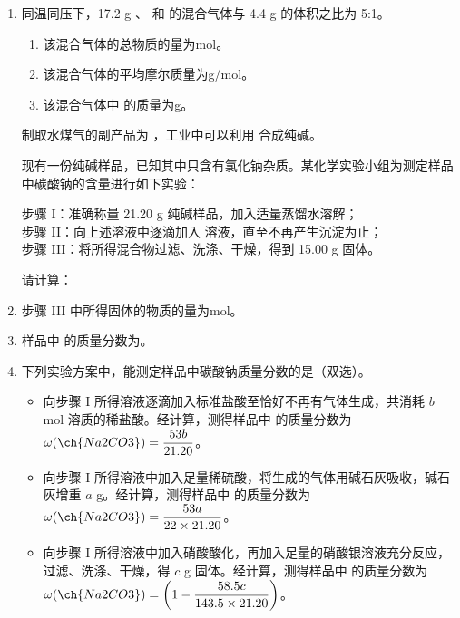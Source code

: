 \documentclass[11pt,a4paper]{article}
\begin{document}
\begin{enumerate}[label=（\arabic*）]
\item 同温同压下，17.2 g 、 和  的混合气体与 4.4 g  的体积之比为 5:1。
\begin{enumerate}[label=\textcircled{\arabic*}]
\item 该混合气体的总物质的量为\blank[3em]mol。
\item 该混合气体的平均摩尔质量为\blank[3em]g/mol。
\item 该混合气体中  的质量为\blank[3em]g。
\end{enumerate}

制取水煤气的副产品为 ，工业中可以利用  合成纯碱。

现有一份纯碱样品，已知其中只含有氯化钠杂质。某化学实验小组为测定样品中碳酸钠的含量进行如下实验：

\noindent 步骤 I：准确称量 21.20 g 纯碱样品，加入适量蒸馏水溶解；\\
步骤 II：向上述溶液中逐滴加入  溶液，直至不再产生沉淀为止；\\
步骤 III：将所得混合物过滤、洗涤、干燥，得到 15.00 g 固体。

请计算：

\item 步骤 III 中所得固体的物质的量为\blank[3em]mol。

\item 样品中  的质量分数为\blank[3em]。

\item 下列实验方案中，能测定样品中碳酸钠质量分数的是\blank[3em]（双选）。
\begin{itemize}[leftmargin=2em,itemsep=0.1em]
\item[A.] 向步骤 I 所得溶液逐滴加入标准盐酸至恰好不再有气体生成，共消耗 $b$ mol 溶质的稀盐酸。经计算，测得样品中  的质量分数为 $\omega(\ch{Na2CO3}) = \dfrac{53b}{21.20}$。
\item[B.] 向步骤 I 所得溶液中加入足量稀硫酸，将生成的气体用碱石灰吸收，碱石灰增重 $a$ g。经计算，测得样品中  的质量分数为 $\omega(\ch{Na2CO3}) = \dfrac{53a}{22\times 21.20}$。
\item[C.] 向步骤 I 所得溶液中加入硝酸酸化，再加入足量的硝酸银溶液充分反应，过滤、洗涤、干燥，得 $c$ g 固体。经计算，测得样品中  的质量分数为 $\omega(\ch{Na2CO3}) = \left(1 - \dfrac{58.5c}{143.5\times 21.20}\right)$。
\end{itemize}
\end{enumerate}
\end{document}
